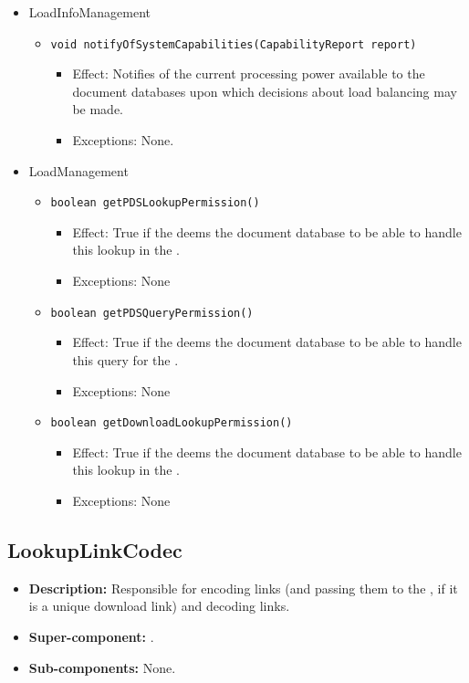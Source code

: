 \begin{itemize}
    \item LoadInfoManagement
    \begin{itemize}
        \item \texttt{void notifyOfSystemCapabilities(CapabilityReport report)}
        \begin{itemize}
            \item Effect: Notifies of the current processing power available to the document databases upon which decisions about load balancing may be made.
            \item Exceptions: None.
        \end{itemize}
    \end{itemize}

    \item LoadManagement
    \begin{itemize}
        \item \texttt{boolean getPDSLookupPermission()}
        \begin{itemize}
            \item Effect: True if the  deems the document database to be able to handle this lookup in the .
            \item Exceptions: None
        \end{itemize}

		\item \texttt{boolean getPDSQueryPermission()}
        \begin{itemize}
            \item Effect: True if the  deems the document database to be able to handle this query for the .
            \item Exceptions: None
        \end{itemize}

		\item \texttt{boolean getDownloadLookupPermission()}
        \begin{itemize}
            \item Effect: True if the  deems the document database to be able to handle this lookup in the .
            \item Exceptions: None
        \end{itemize}
    \end{itemize}
\end{itemize}

\subsection{LookupLinkCodec}
\begin{itemize}
    \item \textbf{Description:} Responsible for encoding links (and passing them to the , if it is a unique download link) and decoding links.
    \item \textbf{Super-component:} .
    \item \textbf{Sub-components:} None.
\end{itemize}

